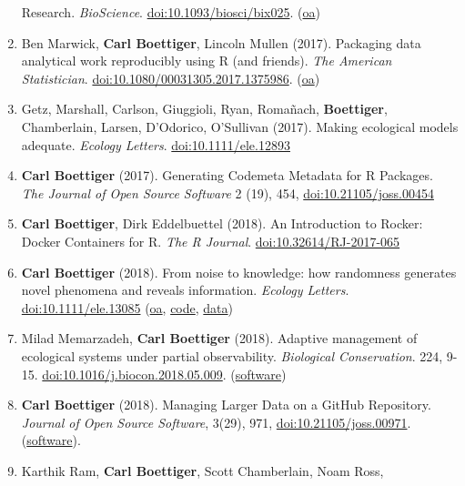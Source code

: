 \documentclass[10pt,sans]{moderncv}        %
\begin{document}
\begin{enumerate}
  Research. \emph{BioScience}.
  \href{https://doi.org/10.1093/biosci/bix025}{doi:10.1093/biosci/bix025}.
  (\href{https://doi.org/10.1093/biosci/bix025}{oa})
\item
  Ben Marwick, \textbf{Carl Boettiger}, Lincoln Mullen (2017). Packaging
  data analytical work reproducibly using R (and friends). \emph{The
  American Statistician}.
  \href{https://doi.org/10.1080/00031305.2017.1375986}{doi:10.1080/00031305.2017.1375986}.
  (\href{https://doi.org/10.7287/peerj.preprints.3192v1}{oa})
\item
  Getz, Marshall, Carlson, Giuggioli, Ryan, Romañach,
  \textbf{Boettiger}, Chamberlain, Larsen, D'Odorico, O'Sullivan (2017).
  Making ecological models adequate. \emph{Ecology Letters}.
  \href{https://doi.org/10.1111/ele.12893}{doi:10.1111/ele.12893}
\item
  \textbf{Carl Boettiger} (2017). Generating Codemeta Metadata for R
  Packages.\\
  \emph{The Journal of Open Source Software} 2 (19), 454,
  \href{https://doi.org/10.21105/joss.00454}{doi:10.21105/joss.00454}
\item
  \textbf{Carl Boettiger}, Dirk Eddelbuettel (2018). An Introduction to
  Rocker: Docker Containers for R. \emph{The R Journal}.
  \href{https://doi.org/10.32614/RJ-2017-065}{doi:10.32614/RJ-2017-065}
\item
  \textbf{Carl Boettiger} (2018). From noise to knowledge: how
  randomness generates novel phenomena and reveals information.
  \emph{Ecology Letters}.
  \href{https://doi.org/10.1111/ele.13085}{doi:10.1111/ele.13085}
  (\href{https://github.com/cboettig/noise-phenomena/raw/master/paper/paper.pdf}{oa},
  \href{https://github.com/cboettig/noise-phenomena}{code},
  \href{https://doi.org/10.5281/zenodo.1219779}{data})
\item
  Milad Memarzadeh, \textbf{Carl Boettiger} (2018). Adaptive management
  of ecological systems under partial observability. \emph{Biological
  Conservation}. 224, 9-15.
  \href{https://doi.org/10.1016/j.biocon.2018.05.009}{doi:10.1016/j.biocon.2018.05.009}.
  (\href{https://github.com/boettiger-lab/pomdpplus}{software})
\item
  \textbf{Carl Boettiger} (2018). Managing Larger Data on a GitHub
  Repository. \emph{Journal of Open Source Software}, 3(29), 971,
  \href{https://doi.org/10.21105/joss.00971}{doi:10.21105/joss.00971}.
  (\href{https://doi.org/10.5281/zenodo.1432525}{software}).
\item
  Karthik Ram, \textbf{Carl Boettiger}, Scott Chamberlain, Noam Ross,

\end{enumerate}
\end{document}
